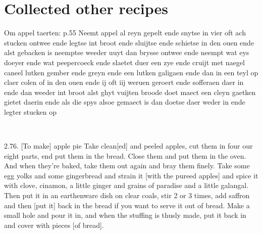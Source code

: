 \documentclass[a4paper]{article}
\begin{document}
\section{Collected other recipes}


\medskip
\begin{minipage}{.45\textwidth}
Om appel taerten:
p.55 Neemt appel al reyn gepelt ende snytse in vier oft ach stucken ontwee ende legtse int broot ende sluijtse ende schietse in den ouen ende alst gebacken is neemptse weeder uuyt dan brysse ontwee ende neempt wat eys doeyer ende wat peepercoeck ende slaetet duer een zye ende cruijt met naegel caneel lutken gember ende greyn ende een lutken galigaen ende dan in een teyl op claer colen of in den ouen ende ij oft iij weruen geroert ende sofferaen daer in ende dan weeder int broot alst ghyt vuijten broode doet maect een cleyn gaetken gietet daerin ende als die spys alsoe gemaect is dan doetse daer weder in ende legter stucken op	\cite{KANTL15}
\end{minipage}
\begin{minipage}{0.05\textwidth}
\ \ \ 
\end{minipage}
\begin{minipage}{.45\textwidth}
2.76. [To make] apple pie
Take clean[ed] and peeled apples, cut them in four our eight parts, end put them in the bread. Close them and put them in the oven. And when they're baked, take them out again and bray them finely. Take some egg yolks and some gingerbread and strain it [with the pureed apples] and spice it with clove, cinamon, a little ginger and grains of paradise and a little galangal. Then put it in an earthenware dish on clear coals, stir 2 or 3 times, add saffron and then [put it] back in the bread if you want to serve it out of bread. Make a small hole and pour it in, and when the stuffing is thusly made, put it back in and cover with pieces [of bread]. \cite{KANTL15}
\cite{KANTL15}
\end{minipage}
\end{document}
